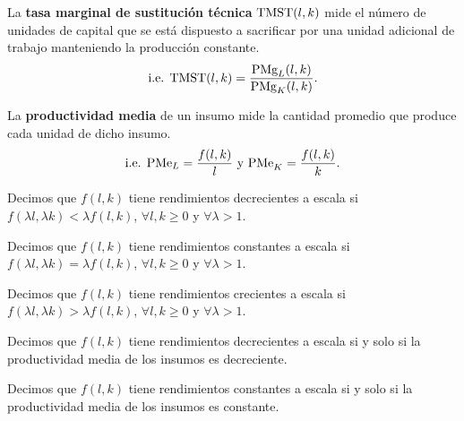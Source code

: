 \documentclass[8pt,a4paper]{extarticle}
\begin{document}
\begin{multicols}{3}
\begin{boxdef}
	La \textbf{tasa marginal de sustitución técnica} $\text{\normalfont TMST} (l, k) $ mide el número de unidades de capital que se está dispuesto a sacrificar por una unidad adicional de trabajo manteniendo la producción constante.
	\[
		\text{\normalfont i.e. TMST}(l,k) = \frac{\text{\normalfont PMg}_L (l, k)}{\text{\normalfont PMg}_K (l, k)}
	.\] 
\end{boxdef}

\begin{boxdef}
	La \textbf{productividad media} de un insumo mide la cantidad promedio que produce cada unidad de dicho insumo.
	\[
		\text{\normalfont i.e. PMe}_L = \frac{f (l, k)}{l}\ \text{\normalfont y PMe}_K = \frac{f (l, k)}{k}
	.\] 
\end{boxdef}

\begin{boxtheo}
	Decimos que $f(l, k)$ tiene rendimientos decrecientes a escala si $f(\lambda l, \lambda k) < \lambda f(l, k)$,\; $\forall l, k \ge 0$ y $\forall \lambda > 1$.
\end{boxtheo}

\begin{boxtheo}
	Decimos que $f(l, k)$ tiene rendimientos constantes a escala si $f(\lambda l, \lambda k) = \lambda f(l, k)$,\; $\forall l, k \ge 0$ y $\forall \lambda > 1$.
\end{boxtheo}

\begin{boxtheo}
	Decimos que $f(l, k)$ tiene rendimientos crecientes a escala si $f(\lambda l, \lambda k) > \lambda f(l, k)$,\; $\forall l, k \ge 0$ y $\forall \lambda > 1$.
\end{boxtheo}

\begin{boxprop}
	Decimos que $f(l, k)$ tiene rendimientos decrecientes a escala si y solo si la productividad media de los insumos es decreciente.
\end{boxprop}

\begin{boxprop}                                                                                                                                  
    Decimos que $f(l, k)$ tiene rendimientos constantes a escala si y solo si la productividad media de los insumos es constante.        
\end{boxprop}


\end{multicols}
\end{document}
